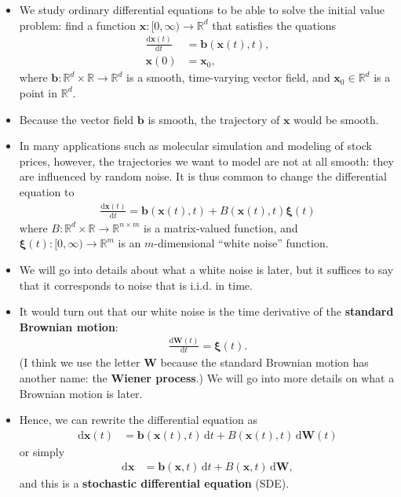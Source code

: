 \documentclass[10pt]{article}
\newcommand{\dee}{\mathrm{d}}
\newcommand{\ve}[1]{\mathbf{#1}}
\newcommand{\ves}[1]{\boldsymbol{#1}}
\newcommand{\Real}{\mathbb{R}}
\begin{document}
\begin{itemize}
  \item We study ordinary differential equations to be able to solve the initial value problem: find a function $\ve{x}: [0,\infty) \rightarrow \Real^d$ that satisfies the quations
  \begin{align*}
    \frac{ \dee \ve{x}(t) }{\dee t} &= \ve{b}(\ve{x}(t), t), \\
    \ve{x}(0) &= \ve{x}_0,
  \end{align*}
  where $\ve{b}: \Real^d \times \Real \rightarrow \Real^d$ is a smooth, time-varying vector field, and $\ve{x}_0 \in \Real^d$ is a point in $\Real^d$.

  \item Because the vector field $\ve{b}$ is smooth, the trajectory of $\ve{x}$ would be smooth.
  
  \item In many applications such as molecular simulation and modeling of stock prices, however, the trajectories we want to model are not at all smooth: they are influenced by random noise. It is thus common to change the differential equation to
  \begin{align*}
    \frac{\dee\ve{x}(t)}{\dee t} = \ve{b}(\ve{x}(t), t) + B(\ve{x}(t), t)\ves{\xi}(t)
  \end{align*}
  where $B: \Real^d \times \Real \rightarrow \Real^{n \times m}$ is a matrix-valued function, and $\ves{\xi}(t): [0,\infty) \rightarrow \Real^m$ is an $m$-dimensional ``white noise'' function.

  \item We will go into details about what a white noise is later, but it suffices to say that it corresponds to noise that is i.i.d. in time.
  
  \item It would turn out that our white noise is the time derivative of the {\bf standard Brownian motion}:
  \begin{align*}
    \frac{\dee\ve{W}(t)}{\dee t} = \ves{\xi}(t).
  \end{align*}
  (I think we use the letter $\ve{W}$ because the standard Brownian motion has another name: the {\bf Wiener process}.) We will go into more details on what a Brownian motion is later.

  \item Hence, we can rewrite the differential equation as
  \begin{align}
    \dee\ve{x}(t) &= \ve{b}(\ve{x}(t), t)\, \dee t + B(\ve{x}(t), t)\, \dee\ve{W}(t) \label{eqn:sde}
  \end{align}
  or simply
  \begin{align*}
    \dee\ve{x} &= \ve{b}(\ve{x},t)\, \dee t + B(\ve{x},t)\, \dee\ve{W}, 
  \end{align*}
  and this is a {\bf stochastic differential equation} (SDE).


\end{itemize}
\end{document}
